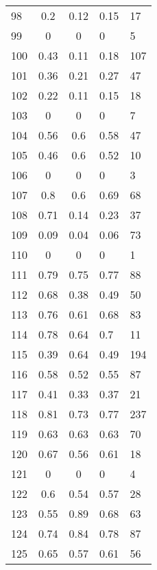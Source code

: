 \begin{longtable}[c]{|l|c|c|l|l|}
	98       & 0.2       & 0.12   & 0.15     & 17      \\
	99       & 0         & 0      & 0        & 5       \\
	100      & 0.43      & 0.11   & 0.18     & 107     \\
	101      & 0.36      & 0.21   & 0.27     & 47      \\
	102      & 0.22      & 0.11   & 0.15     & 18      \\
	103      & 0         & 0      & 0        & 7       \\
	104      & 0.56      & 0.6    & 0.58     & 47      \\
	105      & 0.46      & 0.6    & 0.52     & 10      \\
	106      & 0         & 0      & 0        & 3       \\
	107      & 0.8       & 0.6    & 0.69     & 68      \\
	108      & 0.71      & 0.14   & 0.23     & 37      \\
	109      & 0.09      & 0.04   & 0.06     & 73      \\
	110      & 0         & 0      & 0        & 1       \\
	111      & 0.79      & 0.75   & 0.77     & 88      \\
	112      & 0.68      & 0.38   & 0.49     & 50      \\
	113      & 0.76      & 0.61   & 0.68     & 83      \\
	114      & 0.78      & 0.64   & 0.7      & 11      \\
	115      & 0.39      & 0.64   & 0.49     & 194     \\
	116      & 0.58      & 0.52   & 0.55     & 87      \\
	117      & 0.41      & 0.33   & 0.37     & 21      \\
	118      & 0.81      & 0.73   & 0.77     & 237     \\
	119      & 0.63      & 0.63   & 0.63     & 70      \\
	120      & 0.67      & 0.56   & 0.61     & 18      \\
	121      & 0         & 0      & 0        & 4       \\
	122      & 0.6       & 0.54   & 0.57     & 28      \\
	123      & 0.55      & 0.89   & 0.68     & 63      \\
	124      & 0.74      & 0.84   & 0.78     & 87      \\
	125      & 0.65      & 0.57   & 0.61     & 56      \\

\end{longtable}
